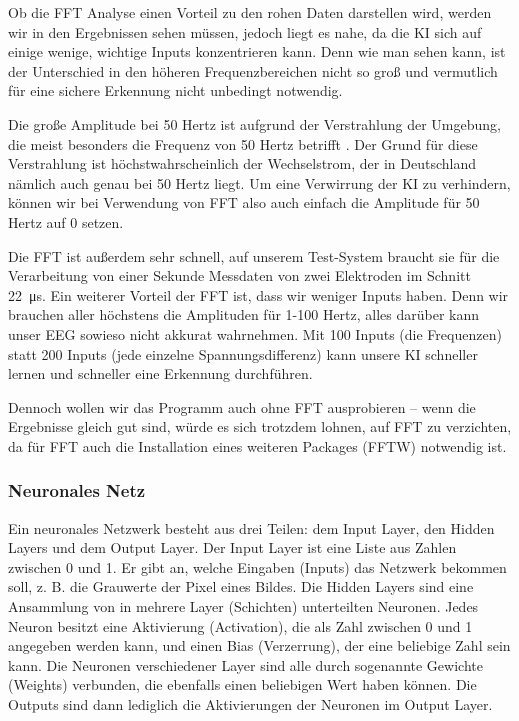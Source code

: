 \documentclass[11pt]{scrartcl}
\begin{document}
	Ob die FFT Analyse einen Vorteil zu den rohen Daten darstellen wird, werden wir in den Ergebnissen sehen müssen, jedoch liegt es nahe, da die KI sich auf einige wenige, wichtige Inputs konzentrieren kann. Denn wie man sehen kann, ist der Unterschied in den höheren Frequenzbereichen nicht so groß und vermutlich für eine sichere Erkennung nicht unbedingt notwendig.

	Die große Amplitude bei 50 Hertz ist aufgrund der Verstrahlung der Umgebung, die meist besonders die Frequenz von 50 Hertz betrifft \cite{Praktikum}. Der Grund für diese Verstrahlung ist höchstwahrscheinlich der Wechselstrom, der in Deutschland nämlich auch genau bei 50 Hertz liegt. Um eine Verwirrung der KI zu verhindern, können wir bei Verwendung von FFT also auch einfach die Amplitude für 50 Hertz auf 0 setzen.

	Die FFT ist außerdem sehr schnell, auf unserem Test-System braucht sie für die Verarbeitung von einer Sekunde Messdaten von zwei Elektroden im Schnitt \qty{22}{\micro\second}. Ein weiterer Vorteil der FFT ist, dass wir weniger Inputs haben. Denn wir brauchen aller höchstens die Amplituden für 1-100 Hertz, alles darüber kann unser EEG sowieso nicht akkurat wahrnehmen. Mit 100 Inputs (die Frequenzen) statt 200 Inputs (jede einzelne Spannungsdifferenz) kann unsere KI schneller lernen und schneller eine Erkennung durchführen.

	Dennoch wollen wir das Programm auch ohne FFT ausprobieren -- wenn die Ergebnisse gleich gut sind, würde es sich trotzdem lohnen, auf FFT zu verzichten, da für FFT auch die Installation eines weiteren Packages (FFTW) notwendig ist. 

	\subsubsection{Neuronales Netz}

	Ein neuronales Netzwerk besteht aus drei Teilen: dem Input Layer, den Hidden Layers und dem Output Layer. 
	Der Input Layer ist eine Liste aus Zahlen zwischen 0 und 1. Er gibt an, welche Eingaben (Inputs) das Netzwerk bekommen soll, z. B. die Grauwerte der Pixel eines Bildes.
	Die Hidden Layers sind eine Ansammlung von in mehrere Layer (Schichten) unterteilten Neuronen.
	Jedes Neuron besitzt eine Aktivierung (Activation), die als Zahl zwischen 0 und 1 angegeben werden kann, und einen Bias (Verzerrung), der eine beliebige Zahl sein kann. Die Neuronen verschiedener Layer sind alle durch sogenannte Gewichte (Weights) verbunden, die ebenfalls einen beliebigen Wert haben können.
	Die Outputs sind dann lediglich die Aktivierungen der Neuronen im Output Layer.
\end{document}
